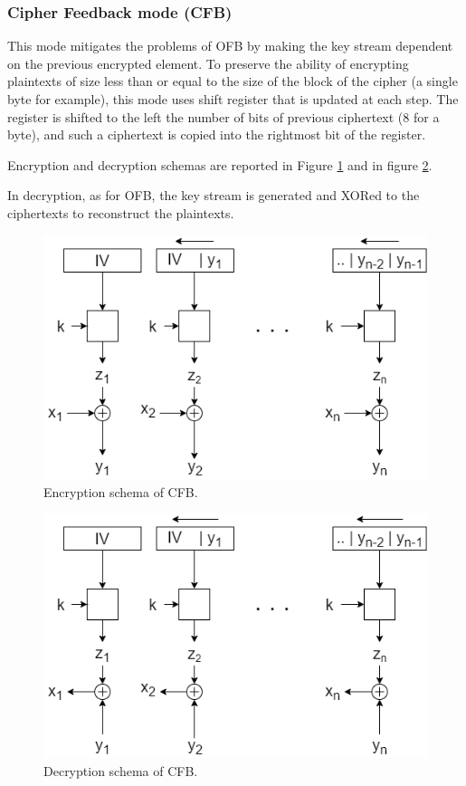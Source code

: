 \documentclass[a4paper, 12pt]{report}
\begin{document}
\subsubsection{Cipher Feedback mode (CFB)}
This mode mitigates the problems of OFB by making the key stream dependent on the previous encrypted element. To preserve the ability of encrypting plaintexts of size less than or equal to the size of the block of the cipher (a single byte for example), this mode uses shift register that is updated at each step. The register is shifted to the left the number of bits of previous ciphertext (8 for a byte), and such a ciphertext is copied into the rightmost bit of the register.

Encryption and decryption schemas are reported in Figure \ref{fig:encCFB} and in figure \ref{fig:decCFB}.

In decryption, as for OFB, the key stream is generated and XORed to the ciphertexts to reconstruct the plaintexts.
\begin{figure}[H]
	\centering
	\includegraphics[scale=0.55]{images/Lec9/encCFB.png}
	\caption{Encryption schema of CFB.}
	\label{fig:encCFB}
\end{figure}

\begin{figure}[H]
	\centering
	\includegraphics[scale=0.55]{images/Lec9/decCFB.png}
	\caption{Decryption schema of CFB.}
	\label{fig:decCFB}
\end{figure}
\end{document}
